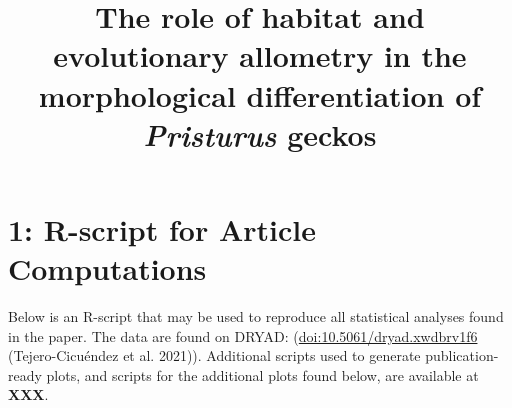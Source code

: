 \documentclass[
  11pt,
]{article}
\title{The role of habitat and evolutionary allometry in the
morphological differentiation of \emph{Pristurus} geckos}
\author{}
\date{\vspace{-2.5em}}
\begin{document}
\maketitle

\hypertarget{r-script-for-article-computations}{%
\section{1: R-script for Article
Computations}\label{r-script-for-article-computations}}

Below is an R-script that may be used to reproduce all statistical
analyses found in the paper. The data are found on DRYAD:
(\url{doi:10.5061/dryad.xwdbrv1f6} (Tejero-Cicuéndez et al. 2021)).
Additional scripts used to generate publication-ready plots, and scripts
for the additional plots found below, are available at \textbf{XXX}.
\end{document}
